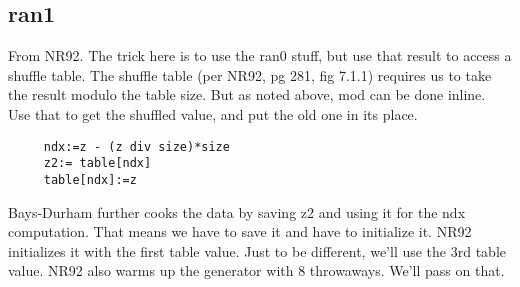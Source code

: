 \subsection*{ran1}
From NR92.  The trick here is to use the ran0 stuff, but use that
result to access a shuffle table.  The shuffle table (per
NR92, pg 281, fig 7.1.1) requires us to take the result
modulo the table size.  But as noted above, mod can be done
inline.  Use that to get the shuffled value, and put the old
one in its place.
\begin{verbatim}
     ndx:=z - (z div size)*size
     z2:= table[ndx]
     table[ndx]:=z
\end{verbatim}
     
Bays-Durham further cooks the data by saving z2 and using it
for the ndx computation.  That means we have to save it and
have to initialize it.  NR92 initializes it with the first
table value.  Just to be different, we'll use the 3rd table
value.  NR92 also warms up the generator with 8 throwaways.
We'll pass on that.



